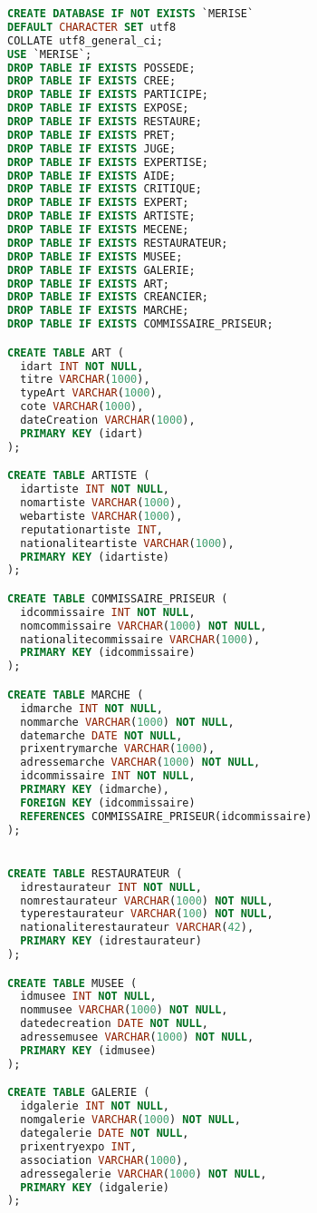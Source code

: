 \documentclass{article}
\begin{document}
\begin{multicols}{2}


\begin{lstlisting}[language=SQL]
CREATE DATABASE IF NOT EXISTS `MERISE`
DEFAULT CHARACTER SET utf8
COLLATE utf8_general_ci;
USE `MERISE`;
DROP TABLE IF EXISTS POSSEDE;
DROP TABLE IF EXISTS CREE;
DROP TABLE IF EXISTS PARTICIPE;
DROP TABLE IF EXISTS EXPOSE;
DROP TABLE IF EXISTS RESTAURE;
DROP TABLE IF EXISTS PRET;
DROP TABLE IF EXISTS JUGE;
DROP TABLE IF EXISTS EXPERTISE;
DROP TABLE IF EXISTS AIDE;
DROP TABLE IF EXISTS CRITIQUE;
DROP TABLE IF EXISTS EXPERT;
DROP TABLE IF EXISTS ARTISTE;
DROP TABLE IF EXISTS MECENE;
DROP TABLE IF EXISTS RESTAURATEUR;
DROP TABLE IF EXISTS MUSEE;
DROP TABLE IF EXISTS GALERIE;
DROP TABLE IF EXISTS ART;
DROP TABLE IF EXISTS CREANCIER;
DROP TABLE IF EXISTS MARCHE;
DROP TABLE IF EXISTS COMMISSAIRE_PRISEUR;

CREATE TABLE ART (
  idart INT NOT NULL,
  titre VARCHAR(1000),
  typeArt VARCHAR(1000),
  cote VARCHAR(1000),
  dateCreation VARCHAR(1000),
  PRIMARY KEY (idart)
);

CREATE TABLE ARTISTE (
  idartiste INT NOT NULL,
  nomartiste VARCHAR(1000),
  webartiste VARCHAR(1000),
  reputationartiste INT,
  nationaliteartiste VARCHAR(1000),
  PRIMARY KEY (idartiste)
);

CREATE TABLE COMMISSAIRE_PRISEUR (
  idcommissaire INT NOT NULL,
  nomcommissaire VARCHAR(1000) NOT NULL,
  nationalitecommissaire VARCHAR(1000),
  PRIMARY KEY (idcommissaire)
);

CREATE TABLE MARCHE (
  idmarche INT NOT NULL,
  nommarche VARCHAR(1000) NOT NULL,
  datemarche DATE NOT NULL,
  prixentrymarche VARCHAR(1000),
  adressemarche VARCHAR(1000) NOT NULL,
  idcommissaire INT NOT NULL,
  PRIMARY KEY (idmarche),
  FOREIGN KEY (idcommissaire)
  REFERENCES COMMISSAIRE_PRISEUR(idcommissaire)
);


CREATE TABLE RESTAURATEUR (
  idrestaurateur INT NOT NULL,
  nomrestaurateur VARCHAR(1000) NOT NULL,
  typerestaurateur VARCHAR(100) NOT NULL,
  nationaliterestaurateur VARCHAR(42),
  PRIMARY KEY (idrestaurateur)
);

CREATE TABLE MUSEE (
  idmusee INT NOT NULL,
  nommusee VARCHAR(1000) NOT NULL,
  datedecreation DATE NOT NULL,
  adressemusee VARCHAR(1000) NOT NULL,
  PRIMARY KEY (idmusee)
);

CREATE TABLE GALERIE (
  idgalerie INT NOT NULL,
  nomgalerie VARCHAR(1000) NOT NULL,
  dategalerie DATE NOT NULL,
  prixentryexpo INT,
  association VARCHAR(1000),
  adressegalerie VARCHAR(1000) NOT NULL,
  PRIMARY KEY (idgalerie)
);


\end{lstlisting}
\end{multicols}
\end{document}

